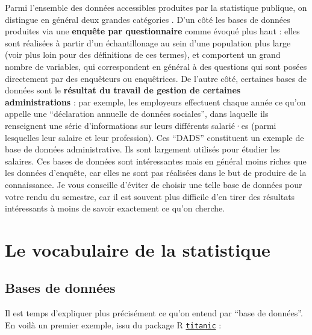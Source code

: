\documentclass[
  french,
]{book}
\begin{document}
Parmi l'ensemble des données accessibles produites par la statistique publique, on distingue en général deux grandes catégories \citep{desrosières2005} . D'un côté les bases de données produites via une \textbf{enquête par questionnaire} comme évoqué plus haut : elles sont réalisées à partir d'un échantillonage au sein d'une population plus large (voir plus loin pour des définitions de ces termes), et comportent un grand nombre de variables, qui correspondent en général à des questions qui sont posées directement par des enquêteurs ou enquêtrices. De l'autre côté, certaines bases de données sont le \textbf{résultat du travail de gestion de certaines administrations} : par exemple, les employeurs effectuent chaque année ce qu'on appelle une ``déclaration annuelle de données sociales'', dans laquelle ils renseignent une série d'informations sur leurs différents salarié·es (parmi lesquelles leur salaire et leur profession). Ces ``DADS'' constituent un exemple de base de données administrative. Ils sont largement utilisés pour étudier les salaires. Ces bases de données sont intéressantes mais en général moins riches que les données d'enquête, car elles ne sont pas réalisées dans le but de produire de la connaissance. Je vous conseille d'éviter de choisir une telle base de données pour votre rendu du semestre, car il est souvent plus difficile d'en tirer des résultats intéressants à moins de savoir exactement ce qu'on cherche.

\hypertarget{le-vocabulaire-de-la-statistique}{%
\section{Le vocabulaire de la statistique}\label{le-vocabulaire-de-la-statistique}}

\hypertarget{bases-de-donnuxe9es}{%
\subsection{Bases de données}\label{bases-de-donnuxe9es}}

Il est temps d'expliquer plus précisément ce qu'on entend par ``base de données''. En voilà un premier exemple, issu du package R \href{https://cran.r-project.org/web/packages/titanic/titanic.pdf}{\texttt{titanic}} :
\end{document}
